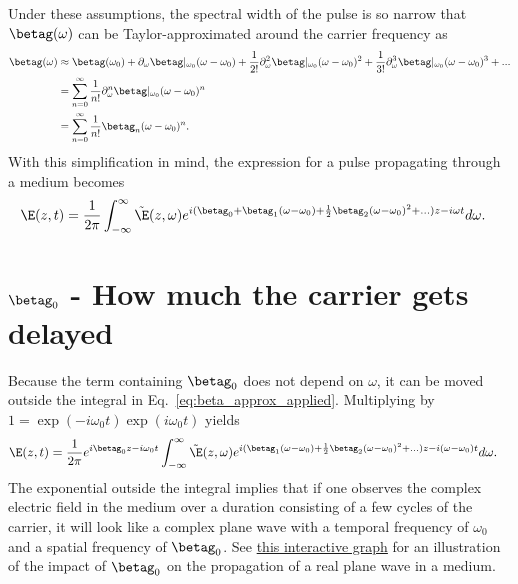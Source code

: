 Under these assumptions, the spectral width of the pulse is so narrow that $\betag(\omega)$ can be Taylor-approximated around the carrier frequency as
\begin{align}
\label{eq:beta_approx}
    \betag(\omega)&\approx \betag(\omega_0)+\partial_\omega\betag|_{\omega_0}(\omega-\omega_0)+\frac{1}{2!}\partial^2_\omega\betag|_{\omega_0}(\omega-\omega_0)^2+
    \frac{1}{3!}\partial^3_\omega\betag|_{\omega_0}(\omega-\omega_0)^3+... \\ \nonumber
    &= \sum_{n=0}^{\infty} \frac{1}{n!}\partial^n_\omega\betag|_{\omega_0}(\omega-\omega_0)^n\\ \nonumber
    &=\sum_{n=0}^{\infty} \frac{1}{n!}\betag_n(\omega-\omega_0)^n.
\end{align}
With this simplification in mind, the expression for a pulse propagating through a medium becomes
\begin{align}
\label{eq:beta_approx_applied}
    \E(z,t) &= \frac{1}{2\pi}\int_{-\infty}^{\infty} \Tilde{\E}(z,\omega) e^{i(\betag_0+\betag_1(\omega-\omega_0)+\frac{1}{2}\betag_2(\omega-\omega_0)^2+...)z-i\omega t} d\omega.
\end{align}


\section{$\betag_0$ - How much the carrier gets delayed}
Because the term containing $\betag_0$ does not depend on $\omega$, it can be moved outside the integral in Eq.~\ref{eq:beta_approx_applied}. Multiplying by $1=\exp(-i\omega_0t)\exp(i\omega_0t)$ yields
\begin{align}
\label{eq:beta_approx_applied2}
    \E(z,t) &= \frac{1}{2\pi} e^{i\betag_0z-i\omega_0t}  \int_{-\infty}^{\infty} \Tilde{\E}(z,\omega) e^{i(\betag_1(\omega-\omega_0)+\frac{1}{2}\betag_2(\omega-\omega_0)^2+...)z-i(\omega-\omega_0) t} d\omega.
\end{align}
The exponential outside the integral implies that if one observes the complex electric field in the medium over a duration consisting of a few cycles of the carrier, it will look like a complex plane wave with a temporal frequency of $\omega_0$ and a spatial frequency of $\betag_0$. See \href{https://www.desmos.com/calculator/ausd1wnl2j}{this interactive graph} for an illustration of the impact of $\betag_0$ on the propagation of a real plane wave in a medium. 

